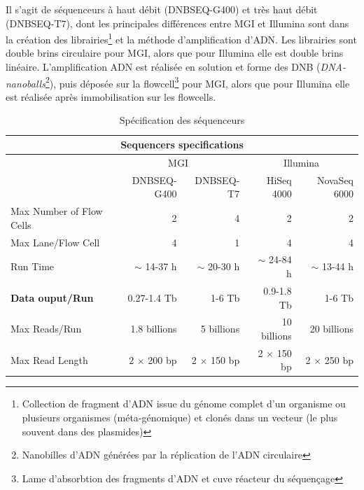     Il s'agit de séquenceurs à haut débit (DNBSEQ-G400) et très haut débit (DNBSEQ-T7), dont les principales différences entre MGI et Illumina sont dans la création des librairies\footnote{Collection de fragment d'ADN issue du génome complet d'un organisme ou plusieurs organismes (méta-génomique) et clonés dans un vecteur (le plus souvent dans des plasmides)} et la méthode d'amplification d'ADN. Les librairies sont double brins circulaire pour MGI, alors que pour Illumina elle est double brins linéaire. L'amplification ADN est réalisée en solution et forme des DNB (\emph{DNA-nanoballs}\footnote{Nanobilles d'ADN générées par la réplication de l'ADN circulaire}), puis déposée sur la flowcell\footnote{Lame d'absorbtion des fragments d'ADN et cuve réacteur du séquençage} pour MGI, alors que pour Illumina elle est réalisée après immobilisation sur les flowcells.

\begin{table}[H]
\begin{tabular}{ |p{5cm}||r|r|r|r| }
    \hline
    \multicolumn{5}{|c|}{Sequencers specifications} \\\hline
    & \multicolumn{2}{|c|}{MGI} & \multicolumn{2}{|c|}{Illumina}\\\hline
    & \footnotesize{DNBSEQ-G400} & \footnotesize{DNBSEQ-T7} & \footnotesize{HiSeq 4000} & \footnotesize{NovaSeq 6000} \\\hline\hline
    Max Number of Flow Cells & 2 & 4 & 2 & 2 \\\hline
    Max Lane/Flow Cell & 4 & 1 & 4 & 4 \\\hline
    Run Time & $\sim$ 14-37 h & $\sim$ 20-30 h & $\sim$ 24-84 h & $\sim$ 13-44 h \\\hline
    \textbf{Data ouput/Run} & 0.27-1.4 Tb & 1-6 Tb & 0.9-1.8 Tb & 1-6 Tb \\\hline
    Max Reads/Run & 1.8 billions & 5 billions & 10 billions & 20 billions \\\hline
    Max Read Length & 2 $\times$ 200 bp & 2 $\times$ 150 bp & 2 $\times$ 150 bp & 2 $\times$ 250 bp \\\hline
\end{tabular}
    \caption{Spécification des séquenceurs}
    \label{spe-seq}
\end{table}
